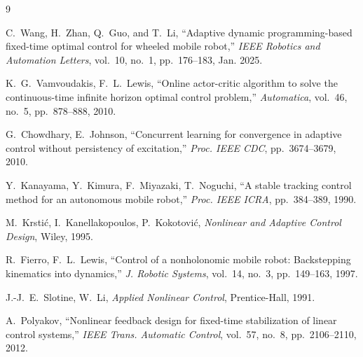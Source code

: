 \documentclass[12pt,a4paper]{article}
\begin{document}
\begin{thebibliography}{9}

C.~Wang, H.~Zhan, Q.~Guo, and T.~Li,
``Adaptive dynamic programming-based fixed-time optimal control for wheeled mobile robot,''
\textit{IEEE Robotics and Automation Letters}, vol.~10, no.~1, pp.~176--183, Jan. 2025.

K.~G.~Vamvoudakis, F.~L.~Lewis, ``Online actor-critic algorithm to solve the continuous-time infinite horizon optimal control problem,''
\textit{Automatica}, vol.~46, no.~5, pp.~878--888, 2010.

G.~Chowdhary, E.~Johnson, ``Concurrent learning for convergence in adaptive control without persistency of excitation,''
\textit{Proc. IEEE CDC}, pp.~3674--3679, 2010.

Y.~Kanayama, Y.~Kimura, F.~Miyazaki, T.~Noguchi, ``A stable tracking control method for an autonomous mobile robot,''
\textit{Proc. IEEE ICRA}, pp.~384--389, 1990.

M.~Krstić, I.~Kanellakopoulos, P.~Kokotović, \textit{Nonlinear and Adaptive Control Design}, Wiley, 1995.

R.~Fierro, F.~L.~Lewis, ``Control of a nonholonomic mobile robot: Backstepping kinematics into dynamics,''
\textit{J. Robotic Systems}, vol.~14, no.~3, pp.~149--163, 1997.

J.-J.~E.~Slotine, W.~Li, \textit{Applied Nonlinear Control}, Prentice-Hall, 1991.

A.~Polyakov, ``Nonlinear feedback design for fixed-time stabilization of linear control systems,''
\textit{IEEE Trans. Automatic Control}, vol.~57, no.~8, pp.~2106--2110, 2012.

\end{thebibliography}
\end{document}

